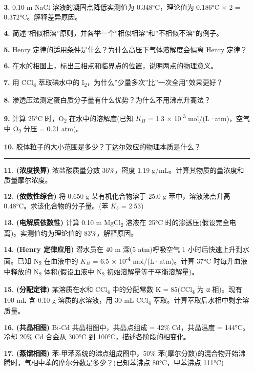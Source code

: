 \textbf{3.} 0.10 m NaCl 溶液的凝固点降低实测值为 0.348°C，理论值为 0.186°C × 2 = 0.372°C。解释差异原因。

\textbf{4.} 简述''相似相溶''原则，并各举一个''相似相溶''和''不相似不溶''的例子。

\textbf{5.} Henry 定律的适用条件是什么？为什么高压下气体溶解度会偏离 Henry 定律？

\textbf{6.} 在水的相图上，标出三相点和临界点的位置，说明两点的物理意义。

\textbf{7.} 用 CCl\textsubscript{4} 萃取碘水中的 I\textsubscript{2}，为什么''少量多次''比''一次全用''效果更好？

\textbf{8.} 渗透压法测定蛋白质分子量有什么优势？为什么不用沸点升高法？

\textbf{9.} 计算 25°C 时，O\textsubscript{2} 在水中的溶解度(已知 \(K_H\) = 1.3 × 10\textsuperscript{-3} mol/(L·atm)，空气中 O\textsubscript{2} 分压 = 0.21 atm)。

\textbf{10.} 胶体粒子的大小范围是多少？丁达尔效应的物理本质是什么？

\begin{center}\rule{0.5\linewidth}{0.5pt}\end{center}

\textbf{11.} \textbf{(浓度换算)} 浓盐酸质量分数 36\%，密度 1.19 g/mL。计算其物质的量浓度和质量摩尔浓度。

\textbf{12.} \textbf{(依数性综合)} 将 0.650 g 某有机化合物溶于 25.0 g 苯中，溶液沸点升高 0.48°C。求该化合物的分子量。(苯 \(K_b\) = 2.53)

\textbf{13.} \textbf{(电解质依数性)} 计算 0.10 m MgCl\textsubscript{2} 溶液在 25°C 时的渗透压(假设完全电离)。实测值约为理论值的 83\%，解释原因。

\textbf{14.} \textbf{(Henry 定律应用)} 潜水员在 40 m 深(5 atm)呼吸空气 1 小时后快速上升到水面。已知 N\textsubscript{2} 在血液中的 \(K_H\) = 6.5 × 10\textsuperscript{-4} mol/(L·atm)。计算 37°C 时每升血液中释放的 N\textsubscript{2} 体积(假设血液中 N\textsubscript{2} 初始溶解量等于平衡溶解量)。

\textbf{15.} \textbf{(分配定律)} 某溶质在水和 CCl\textsubscript{4} 中的分配常数 K = 85(CCl\textsubscript{4} 为 α 相)。现有 100 mL 含 0.10 g 溶质的水溶液，用 30 mL CCl\textsubscript{4} 萃取。计算萃取后水相中剩余溶质量。

\textbf{16.} \textbf{(共晶相图)} Bi-Cd 共晶相图中，共晶点组成 = 42\% Cd，共晶温度 = 144°C。冷却 20\% Cd 合金从 300°C 到 100°C，描述各阶段的相变化。

\textbf{17.} \textbf{(蒸馏相图)} 苯-甲苯系统的沸点组成图中，50\% 苯(摩尔分数)的混合物开始沸腾时，气相中苯的摩尔分数是多少？(已知苯沸点 80°C，甲苯沸点 111°C)

